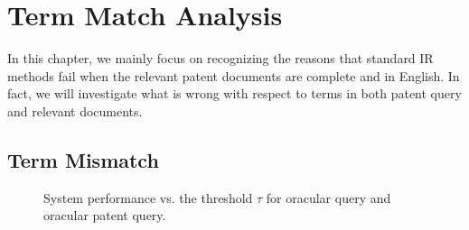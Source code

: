 \chapter{Term Match Analysis}
\label{cha:analysis}
In this chapter, we mainly focus on recognizing the reasons that standard IR methods fail when the relevant patent documents are complete and in English. In fact, we will investigate what is wrong with respect to terms in both patent query and relevant documents. 
\section{Term Mismatch}
\label{sec:termmismatch}
%
\begin{figure}[htpb]

\begin{centering}
\par\end{centering}

\protect\caption{System performance vs. the threshold $\tau$ for oracular query and oracular patent query.}
\label{fig:oracular}
\end{figure}

